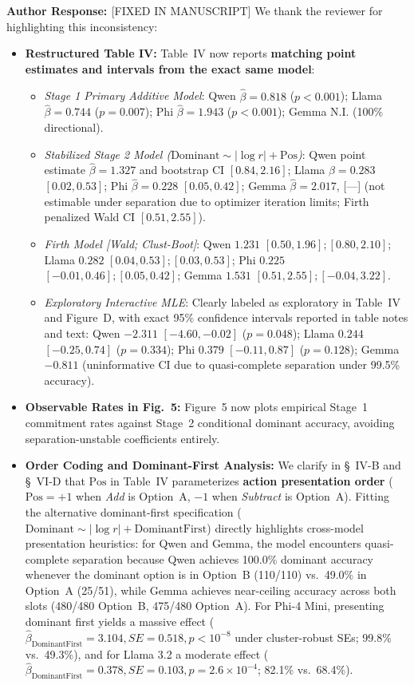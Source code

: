 \documentclass[11pt]{article}
\newcommand{\authorresponse}{\vspace{0.5em}\noindent\textbf{\textcolor{responsecolor}{Author Response: }}}
\begin{document}
\authorresponse [FIXED IN MANUSCRIPT] We thank the reviewer for highlighting this inconsistency:
\begin{itemize}[leftmargin=*]
\item \textbf{Restructured Table IV:} Table~IV now reports \textbf{matching point estimates and intervals from the exact same model}:
  \begin{itemize}
  \item \textit{Stage 1 Primary Additive Model}: Qwen $\hat\beta=0.818$ ($p<0.001$); Llama $\hat\beta=0.744$ ($p=0.007$); Phi $\hat\beta=1.943$ ($p<0.001$); Gemma N.I. (100\% directional).
  \item \textit{Stabilized Stage 2 Model ($\text{Dominant} \sim |\log r| + \text{Pos}$)}: Qwen point estimate $\hat\beta=1.327$ and bootstrap CI $[0.84, 2.16]$; Llama $\hat\beta=0.283$ $[0.02, 0.53]$; Phi $\hat\beta=0.228$ $[0.05, 0.42]$; Gemma $\hat\beta=2.017$, [---] (not estimable under separation due to optimizer iteration limits; Firth penalized Wald CI $[0.51, 2.55]$).
  \item \textit{Firth Model [Wald; Clust-Boot]}: Qwen $1.231$ $[0.50, 1.96]; [0.80, 2.10]$; Llama $0.282$ $[0.04, 0.53]; [0.03, 0.53]$; Phi $0.225$ $[-0.01, 0.46]; [0.05, 0.42]$; Gemma $1.531$ $[0.51, 2.55]; [-0.04, 3.22]$.
  \item \textit{Exploratory Interactive MLE}: Clearly labeled as exploratory in Table~IV and Figure~D, with exact 95\% confidence intervals reported in table notes and text: Qwen $-2.311$ $[-4.60, -0.02]$ ($p=0.048$); Llama $0.244$ $[-0.25, 0.74]$ ($p=0.334$); Phi $0.379$ $[-0.11, 0.87]$ ($p=0.128$); Gemma $-0.811$ (uninformative CI due to quasi-complete separation under 99.5\% accuracy).
  \end{itemize}
\item \textbf{Observable Rates in Fig.~5:} Figure~5 now plots empirical Stage~1 commitment rates against Stage~2 conditional dominant accuracy, avoiding separation-unstable coefficients entirely.
\item \textbf{Order Coding and Dominant-First Analysis:} We clarify in \S~IV-B and \S~VI-D that $\text{Pos}$ in Table~IV parameterizes \textbf{action presentation order} ($\text{Pos}=+1$ when \textit{Add} is Option~A, $-1$ when \textit{Subtract} is Option~A). Fitting the alternative dominant-first specification ($\text{Dominant} \sim |\log r| + \text{DominantFirst}$) directly highlights cross-model presentation heuristics: for Qwen and Gemma, the model encounters quasi-complete separation because Qwen achieves 100.0\% dominant accuracy whenever the dominant option is in Option~B (110/110) vs.\ 49.0\% in Option~A (25/51), while Gemma achieves near-ceiling accuracy across both slots (480/480 Option~B, 475/480 Option~A). For Phi-4 Mini, presenting dominant first yields a massive effect ($\hat\beta_{\text{DominantFirst}} = 3.104, SE = 0.518, p < 10^{-8}$ under cluster-robust SEs; 99.8\% vs.\ 49.3\%), and for Llama 3.2 a moderate effect ($\hat\beta_{\text{DominantFirst}} = 0.378, SE = 0.103, p = 2.6 \times 10^{-4}$; 82.1\% vs.\ 68.4\%).

\end{itemize}
\end{document}
